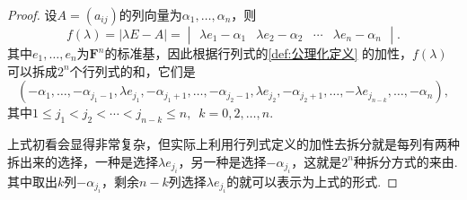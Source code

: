 \begin{proof}
    设$A=(a_{ij})$的列向量为$\alpha_1,\ldots,\alpha_n$，则
    \[f(\lambda)=|\lambda E-A|=\begin{vmatrix}
            \lambda e_1-\alpha_1 & \lambda e_2-\alpha_2 & \cdots & \lambda e_n-\alpha_n
        \end{vmatrix}.\]
    其中$e_1,\ldots,e_n$为$\mathbf{F}^n$的标准基，因此根据行列式的\autoref{def:公理化定义} 的加性，$f(\lambda)$可以拆成$2^n$个行列式的和，它们是
    \begin{equation}\label{eq:18:特征多项式展开}
        (-\alpha_1,\ldots,-\alpha_{j_1-1},\lambda e_{j_1},-\alpha_{j_1+1},\ldots,-\alpha_{j_2-1},\lambda e_{j_2},-\alpha_{j_2+1},\ldots,-\lambda e_{j_{n-k}},\ldots,-\alpha_n),
    \end{equation}
    其中$1\leqslant j_1<j_2<\cdots<j_{n-k}\leqslant n,\enspace k=0,2,\ldots,n$.

    上式初看会显得非常复杂，但实际上利用行列式定义的加性去拆分就是每列有两种拆出来的选择，一种是选择$\lambda e_{j_i}$，另一种是选择$-\alpha_{j_i}$，这就是$2^n$种拆分方式的来由. 其中取出$k$列$-\alpha_{j_i}$，剩余$n-k$列选择$\lambda e_{j_i}$的就可以表示为上式的形式.


\end{proof}
